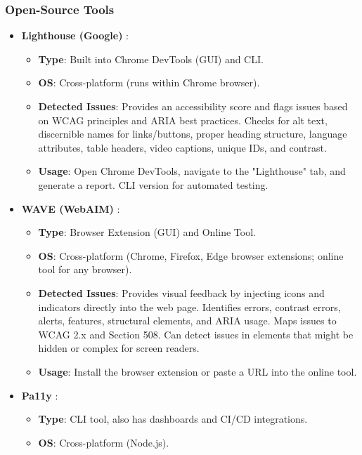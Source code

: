 \subsubsection{Open-Source Tools}
\begin{itemize}
    \item \textbf{Lighthouse (Google)} \cite{Lighthouse}:
        \begin{itemize}
            \item \textbf{Type}: Built into Chrome DevTools (GUI) and CLI.
            \item \textbf{OS}: Cross-platform (runs within Chrome browser).
            \item \textbf{Detected Issues}: Provides an accessibility score and flags issues based on WCAG principles and ARIA best practices. Checks for alt text, discernible names for links/buttons, proper heading structure, language attributes, table headers, video captions, unique IDs, and contrast.
            \item \textbf{Usage}: Open Chrome DevTools, navigate to the "Lighthouse" tab, and generate a report. CLI version for automated testing.
        \end{itemize}
    \item \textbf{WAVE (WebAIM)} \cite{WAVE}:
        \begin{itemize}
            \item \textbf{Type}: Browser Extension (GUI) and Online Tool.
            \item \textbf{OS}: Cross-platform (Chrome, Firefox, Edge browser extensions; online tool for any browser).
            \item \textbf{Detected Issues}: Provides visual feedback by injecting icons and indicators directly into the web page. Identifies errors, contrast errors, alerts, features, structural elements, and ARIA usage. Maps issues to WCAG 2.x and Section 508. Can detect issues in elements that might be hidden or complex for screen readers.
            \item \textbf{Usage}: Install the browser extension or paste a URL into the online tool.
        \end{itemize}
    \item \textbf{Pa11y} \cite{Pa11y}:
        \begin{itemize}
            \item \textbf{Type}: CLI tool, also has dashboards and CI/CD integrations.
            \item \textbf{OS}: Cross-platform (Node.js).

\end{itemize}
\end{itemize}
